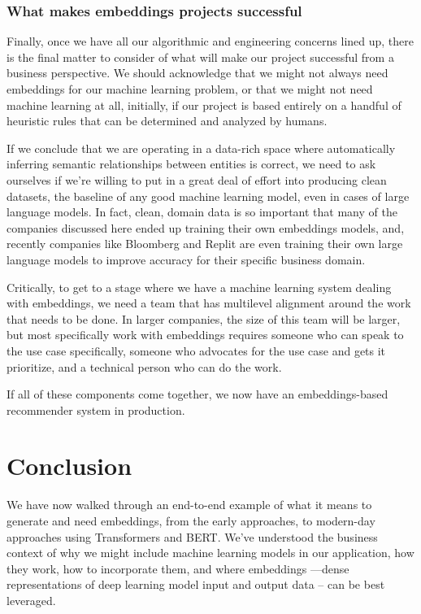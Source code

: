 \documentclass[11pt, table]{diazessay} %
\begin{document}
\begin{sloppypar}
\subsubsection{What makes embeddings projects successful}
Finally, once we have all our algorithmic and engineering concerns lined up, there is the final matter to consider of what will make our project successful from a business perspective. We should acknowledge that we might not always need embeddings for our machine learning problem, or that we might not need machine learning at all, initially, if our project is based entirely on a handful of heuristic rules that can be determined and analyzed by humans\citep{zinkevich2017rules}.

If we conclude that we are operating in a data-rich space where automatically inferring semantic relationships between entities is correct, we need to ask ourselves if we're willing to put in a great deal of effort into producing clean datasets, the baseline of any good machine learning model, even in cases of large language models. In fact, clean, domain data is so important that many of the companies discussed here ended up training their own embeddings models, and, recently companies like Bloomberg\citep{wu2023bloomberggpt} and Replit\citep{Shabani_2023} are even training their own large language models to improve accuracy for their specific business domain.

Critically, to get to a stage where we have a machine learning system dealing with embeddings, we need a team that has multilevel alignment around the work that needs to be done. In larger companies, the size of this team will be larger, but most specifically work with embeddings requires someone who can speak to the use case specifically, someone who advocates for the use case and gets it prioritize, and a technical person who can do the work\citep{meil2023ai}.

If all of these components come together, we now have an embeddings-based recommender system in production.


\section{Conclusion}

We have now walked through an end-to-end example of what it means to generate and need embeddings, from the early approaches, to modern-day approaches using Transformers and BERT. We've understood the business context of why we might include machine learning models in our application, how they work, how to incorporate them, and where embeddings ---dense representations of deep learning model input and output data -- can be best leveraged.  


\end{sloppypar}
\end{document}
